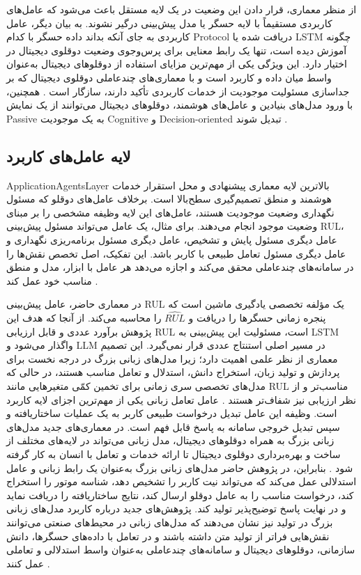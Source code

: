 از منظر معماری، قرار دادن این وضعیت در یک لایه مستقل باعث می‌شود که عامل‌های کاربردی مستقیماً با لایه حسگر یا مدل پیش‌بینی درگیر نشوند. به بیان دیگر، عامل کاربردی به جای آنکه بداند داده حسگر با کدام \gls{Protocol} دریافت شده یا LSTM چگونه آموزش دیده است، تنها یک رابط معنایی برای پرس‌وجوی وضعیت دوقلوی دیجیتال در اختیار دارد. این ویژگی یکی از مهم‌ترین مزایای استفاده از دوقلو‌های دیجیتال به‌عنوان واسط میان داده و کاربرد است و با معماری‌های چندعاملی دوقلوی دیجیتال که بر جداسازی مسئولیت موجودیت از خدمات کاربردی تأکید دارند، سازگار است \cite{pretel2022masdt,lopez2024madtwin,wang2024multiagent}. همچنین، با ورود مدل‌های بنیادین و عامل‌های هوشمند، دوقلوهای دیجیتال می‌توانند از یک نمایش \gls{Passive} به یک موجودیت \gls{Cognitive} و \gls{Decision-oriented} تبدیل شوند \cite{zhou2026dtai,fu2026genaidt}.


\subsection{لایه عامل‌های کاربرد}
\label{sec:layer-app-agents}

\gls{ApplicationAgentsLayer} بالاترین لایه معماری پیشنهادی و محل استقرار خدمات هوشمند و منطق تصمیم‌گیری سطح‌بالا است. برخلاف عامل‌های دوقلو که مسئول نگهداری وضعیت موجودیت هستند، عامل‌های این لایه وظیفه مشخصی را بر مبنای وضعیت موجود انجام می‌دهند. برای مثال، یک عامل می‌تواند مسئول پیش‌بینی \gls{RUL}، عامل دیگری مسئول پایش و تشخیص، عامل دیگری مسئول برنامه‌ریزی نگهداری و عامل دیگری مسئول تعامل طبیعی با کاربر باشد. این تفکیک، اصل تخصص نقش‌ها را در سامانه‌های چندعاملی محقق می‌کند و اجازه می‌دهد هر عامل با ابزار، مدل و منطق مناسب خود عمل کند \cite{dorri2018multiagent,pretel2022masdt,wang2024multiagent}.

در معماری حاضر، عامل پیش‌بینی \gls{RUL} یک مؤلفه تخصصی یادگیری ماشین است که پنجره زمانی حسگرها را دریافت و $\widehat{RUL}$ را محاسبه می‌کند. از آنجا که هدف این پژوهش برآورد عددی و قابل ارزیابی \gls{RUL} است، مسئولیت این پیش‌بینی به LSTM واگذار می‌شود و LLM در مسیر اصلی استنتاج عددی قرار نمی‌گیرد. این تصمیم معماری از نظر علمی اهمیت دارد؛ زیرا مدل‌های زبانی بزرگ در درجه نخست برای پردازش و تولید زبان، استخراج دانش، استدلال و تعامل مناسب هستند، در حالی که مدل‌های تخصصی سری زمانی برای تخمین کمّی متغیرهایی مانند \gls{RUL} مناسب‌تر و از نظر ارزیابی نیز شفاف‌تر هستند \cite{lkgstnet2026}. عامل تعامل زبانی یکی از مهم‌ترین اجزای لایه کاربرد است. وظیفه این عامل تبدیل درخواست طبیعی کاربر به یک عملیات ساختاریافته و سپس تبدیل خروجی سامانه به پاسخ قابل فهم است. در معماری‌های جدید مدل‌های زبانی بزرگ به همراه دوقلو‌های دیجیتال، مدل زبانی می‌تواند در لایه‌های مختلف از ساخت و بهره‌برداری دوقلوی دیجیتال تا ارائه خدمات و تعامل با انسان به کار گرفته شود \cite{CHEN2025102982LLMDT,zhou2026dtai}. بنابراین، در پژوهش حاضر مدل‌های زبانی بزرگ به‌عنوان یک رابط زبانی و عامل استدلالی عمل می‌کند که می‌تواند نیت کاربر را تشخیص دهد، شناسه موتور را استخراج کند، درخواست مناسب را به عامل دوقلو ارسال کند، نتایج ساختاریافته را دریافت نماید و در نهایت پاسخ توضیح‌پذیر تولید کند. پژوهش‌های جدید درباره کاربرد مدل‌های زبانی بزرگ در تولید نیز نشان می‌دهند که مدل‌های زبانی در محیط‌های صنعتی می‌توانند نقش‌هایی فراتر از تولید متن داشته باشند و در تعامل با داده‌های حسگرها، دانش سازمانی، دوقلو‌های دیجیتال و سامانه‌های چندعاملی به‌عنوان واسط استدلالی و تعاملی عمل کنند \cite{maghanaki2026llmmanufacturing}.

